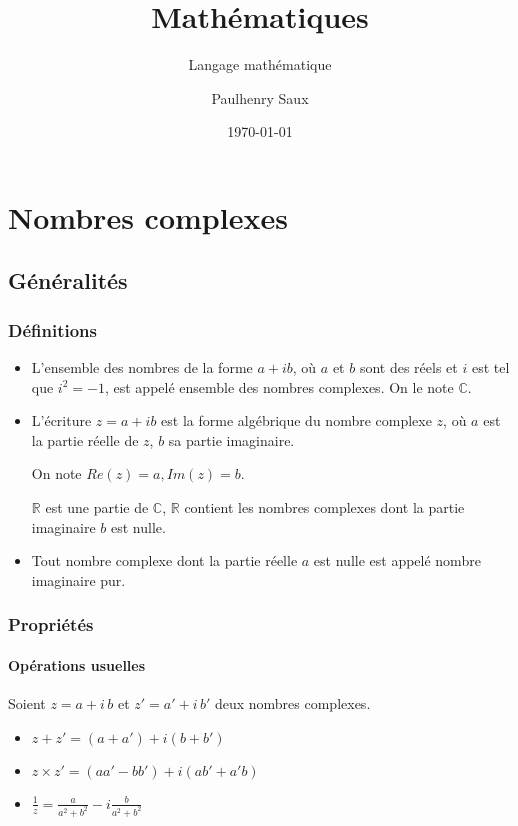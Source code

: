 \documentclass[french]{yLectureNote}
\title{Mathématiques}
\subtitle{Langage mathématique}
\author{Paulhenry Saux}
\date{\today}
\begin{document}
\setcounter{chapter}{5}

	\chapter{Nombres complexes}
\section{Généralités}
\subsection{Définitions}
\begin{itemize}
\item L'ensemble des nombres de la forme $a+ib$, où $a$ et $b$ sont des réels et $i$ est tel que $i^2=-1$, est appelé ensemble des nombres complexes. On le note $\mathbb{C}$.

\item L'écriture $z=a+ib$ est la forme algébrique du nombre complexe $z$, où $a$ est la partie réelle de $z$, $b$ sa partie imaginaire.

On note $Re(z)=a, Im(z)=b$.

$\mathbb{R}$ est une partie de $\mathbb{C}$, $\mathbb{R}$ contient les nombres complexes  dont la partie imaginaire $b$ est nulle.

\item Tout nombre complexe dont la partie réelle $a$ est nulle est appelé nombre imaginaire pur.
\end{itemize}
\subsection{Propriétés}
\subsubsection{Opérations usuelles}
Soient $z=a+i\,b$ et $z'=a'+i\,b'$ deux nombres complexes.

\begin{itemize}
 \item $\displaystyle z+z'=(a+a')+i(b+b')$
 \item $\displaystyle z\times z'=(aa'-bb')+i(ab'+a'b)$
 \item $\displaystyle\frac{1}{z}=\frac{a}{a^2+b^2}-i\frac{b}{a^2+b^2}$
\end{itemize}
\end{document}
